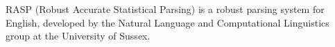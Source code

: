 % 
% 
% 
% 
% 
RASP (Robust Accurate Statistical Parsing) is a robust parsing system
for English, developed by the Natural Language and Computational
Linguistics group at the University of Sussex.

